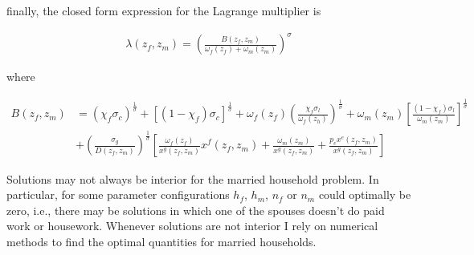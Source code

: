 \documentclass[12pt]{article}
\begin{document}
finally, the closed form expression for the Lagrange multiplier is

\begin{align*}
	\lambda(z_f,z_m) = \left(\frac{B(z_f,z_m)}{\omega_f(z_f)+\omega_m(z_m)}\right)^\sigma
\end{align*}
 
where

\begin{align*}
	B(z_f,z_m) & = \left(\chi_f \sigma_c\right)^{\frac{1}{\sigma}}+\left[\left(1-\chi_f\right) \sigma_c\right]^{\frac{1}{\sigma}}+\omega_f(z_f)\left(\frac{\chi_f \sigma_l}{\omega_f(z_h)}\right)^{\frac{1}{\sigma}}+\omega_m(z_m)\left[\frac{\left(1-\chi_f\right) \sigma_l}{\omega_m(z_m)}\right]^{\frac{1}{\sigma}} \\ & +\left(\frac{\sigma_g}{D(z_f,z_m)}\right)^{\frac{1}{\sigma}}\left[\frac{\omega_f(z_f)}{x^g(z_f,z_m)}x^f(z_f,z_m)+\frac{\omega_m(z_m)}{x^g(z_f,z_m)}+\frac{p_e x^e(z_f,z_m)}{x^g(z_f,z_m)}\right]
\end{align*}
 
Solutions may not always be interior for the married household problem. In particular, for some parameter configurations $h_f$, $h_m$, $n_f$ or $n_m$ could optimally be zero, i.e., there may be solutions in which one of the spouses doesn't do paid work or housework. Whenever solutions are not interior I rely on numerical methods to find the optimal quantities for married households.
 
\end{document}
